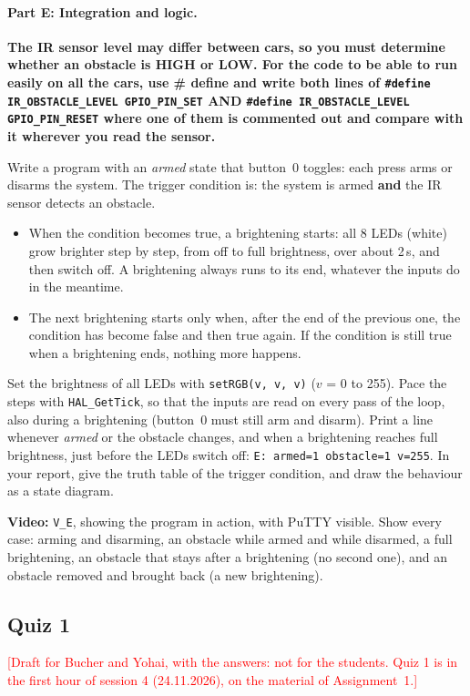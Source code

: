 \documentclass[11pt,a4paper]{article}
\newcommand{\flag}[1]{\textcolor{red}{[#1]}}
\begin{document}
\paragraph{Part E: Integration and logic.}
\textbf{The IR sensor level may differ between cars, so you must determine whether an obstacle is HIGH or LOW. For
the code to be able to run easily on all the cars, use \# define and write both lines of
\texttt{\#define IR\_OBSTACLE\_LEVEL GPIO\_PIN\_SET} AND \texttt{\#define IR\_OBSTACLE\_LEVEL GPIO\_PIN\_RESET} where
one of them is commented out and compare with it wherever you read the sensor.}

\smallskip\noindent
Write a program with an \emph{armed} state that button~0 toggles: each press arms or disarms the system. The trigger
condition is: the system is armed \textbf{and} the IR sensor detects an obstacle.
\begin{itemize}
  \item When the condition becomes true, a brightening starts: all 8 LEDs (white) grow brighter step by step, from off
        to full brightness, over about 2\,s, and then switch off. A brightening always runs to its end, whatever the
        inputs do in the meantime.
  \item The next brightening starts only when, after the end of the previous one, the condition has become false and
        then true again. If the condition is still true when a brightening ends, nothing more happens.
\end{itemize}
Set the brightness of all LEDs with \texttt{setRGB(v, v, v)} ($v$ = 0 to 255). Pace the steps with
\texttt{HAL\_GetTick}, so that the inputs are read on every pass of the loop, also during a brightening (button~0 must
still arm and disarm). Print a line whenever \emph{armed} or the obstacle changes, and when a brightening reaches full
brightness, just before the LEDs switch off: \texttt{E: armed=1 obstacle=1 v=255}. In your report, give the truth
table of the trigger condition, and draw the behaviour as a state diagram.

\noindent\textbf{Video:} \texttt{V\_E}, showing the program in action, with PuTTY visible. Show every case: arming and
disarming, an obstacle while armed and while disarmed, a full brightening, an obstacle that stays after a brightening
(no second one), and an obstacle removed and brought back (a new brightening).

\subsection{Quiz 1}
\flag{Draft for Bucher and Yohai, with the answers: not for the students. Quiz 1 is in the first hour of session 4
(24.11.2026), on the material of Assignment~1.}
\end{document}
